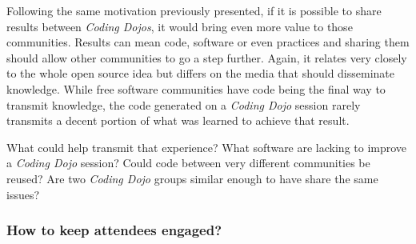 Following the same motivation previously presented, if it is possible
to share results between \textit{Coding Dojos}, it would bring even
more value to those communities. Results can mean code, software or
even practices and sharing them should allow other communities to go a
step further. Again, it relates very closely to the whole open source
idea but differs on the media that should disseminate knowledge. While
free software communities have code being the final way to transmit
knowledge, the code generated on a \textit{Coding Dojo} session rarely
transmits a decent portion of what was learned to achieve that result.

What could help transmit that experience? What software are lacking to
improve a \textit{Coding Dojo} session? Could code between very
different communities be reused? Are two \textit{Coding Dojo} groups
similar enough to have share the same issues?

\subsubsection{How to keep attendees engaged?}
